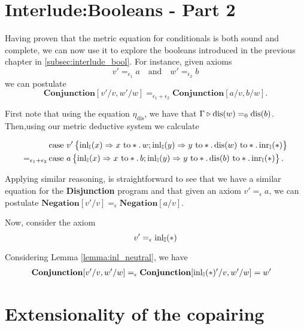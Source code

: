  




\section{Interlude:Booleans - Part 2}

Having proven that the metric equation for conditionals is both sound and complete, we can now use it to explore the booleans introduced in the previous chapter in \autoref{subsec:interlude_bool}. For instance, given axioms
$$ v' =_{\epsilon_1} a \quad \text{and}  \quad w' =_{\epsilon_2} b $$
we can postulate 
$$ \textbf{Conjunction} [v'/v, w'/w]  =_{\epsilon_1 + \epsilon_2}  \textbf{Conjunction} [a/v, b/w]. $$

First note that using the equation $\eta_{\text{dis}}$, we have that $\Gamma \triangleright \text{dis}(w) =_{0} \text{dis}(b)$.
Then,using our metric deductive system we calculate

\begin{align*}
  &\text{case } v'  
    \left\{ \begin{aligned}
    \mathrm{inl}_{\mathbb{I}}(x) \Rightarrow  x \text{ to} *. \, w ;  \mathrm{inl}_{\mathbb{I}}(y) \Rightarrow y \text{ to} *. \,  \text{dis}(w) \text{ to} *. \, \mathrm{inr}_{\mathbb{I}}(*)
  \end{aligned}  \right\}   \\
  =_{\epsilon_1 + \epsilon_2} \, & \text{case } a  
    \left\{ \begin{aligned}
     \mathrm{inl}_{\mathbb{I}}(x) \Rightarrow  x \text{ to} *. \, b ;  \mathrm{inl}_{\mathbb{I}}(y) \Rightarrow y \text{ to} *. \,  \text{dis}(b) \text{ to} *. \, \mathrm{inr}_{\mathbb{I}}(*)
  \end{aligned}  \right\}.
\end{align*}

Applying similar reasoning, is straightforward to see that we have a similar equation for the \textbf{Disjunction} program and that given an axiom $ v' =_{\epsilon} a $, we can postulate $\textbf{Negation} [v'/v] =_{\epsilon} \textbf{Negation} [a/v] $.

Now, consider the axiom
$$ v' =_{\epsilon} \mathrm{inl}_{\mathbb{I}}(*)$$

Considering Lemma \ref{lemma:inl_neutral}, we have
\begin{align*}
   \textbf{Conjunction} [v'/v, w'/w]  &=_{\epsilon}  \textbf{Conjunction} [ \mathrm{inl}_{\mathbb{I}}(*)'/v, w'/w] = w'
\end{align*}


\section{Extensionality of the copairing}

